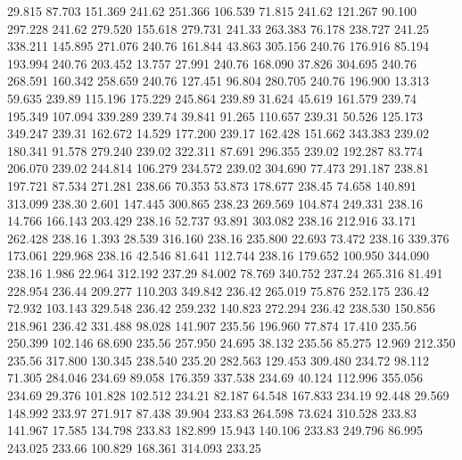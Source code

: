   29.815   87.703  151.369       241.62
 251.366  106.539   71.815       241.62
 121.267   90.100  297.228       241.62
 279.520  155.618  279.731       241.33
 263.383   76.178  238.727       241.25
 338.211  145.895  271.076       240.76
 161.844   43.863  305.156       240.76
 176.916   85.194  193.994       240.76
 203.452   13.757   27.991       240.76
 168.090   37.826  304.695       240.76
 268.591  160.342  258.659       240.76
 127.451   96.804  280.705       240.76
 196.900   13.313   59.635       239.89
 115.196  175.229  245.864       239.89
  31.624   45.619  161.579       239.74
 195.349  107.094  339.289       239.74
  39.841   91.265  110.657       239.31
  50.526  125.173  349.247       239.31
 162.672   14.529  177.200       239.17
 162.428  151.662  343.383       239.02
 180.341   91.578  279.240       239.02
 322.311   87.691  296.355       239.02
 192.287   83.774  206.070       239.02
 244.814  106.279  234.572       239.02
 304.690   77.473  291.187       238.81
 197.721   87.534  271.281       238.66
  70.353   53.873  178.677       238.45
  74.658  140.891  313.099       238.30
   2.601  147.445  300.865       238.23
 269.569  104.874  249.331       238.16
  14.766  166.143  203.429       238.16
  52.737   93.891  303.082       238.16
 212.916   33.171  262.428       238.16
   1.393   28.539  316.160       238.16
 235.800   22.693   73.472       238.16
 339.376  173.061  229.968       238.16
  42.546   81.641  112.744       238.16
 179.652  100.950  344.090       238.16
   1.986   22.964  312.192       237.29
  84.002   78.769  340.752       237.24
 265.316   81.491  228.954       236.44
 209.277  110.203  349.842       236.42
 265.019   75.876  252.175       236.42
  72.932  103.143  329.548       236.42
 259.232  140.823  272.294       236.42
 238.530  150.856  218.961       236.42
 331.488   98.028  141.907       235.56
 196.960   77.874   17.410       235.56
 250.399  102.146   68.690       235.56
 257.950   24.695   38.132       235.56
  85.275   12.969  212.350       235.56
 317.800  130.345  238.540       235.20
 282.563  129.453  309.480       234.72
  98.112   71.305  284.046       234.69
  89.058  176.359  337.538       234.69
  40.124  112.996  355.056       234.69
  29.376  101.828  102.512       234.21
  82.187   64.548  167.833       234.19
  92.448   29.569  148.992       233.97
 271.917   87.438   39.904       233.83
 264.598   73.624  310.528       233.83
 141.967   17.585  134.798       233.83
 182.899   15.943  140.106       233.83
 249.796   86.995  243.025       233.66
 100.829  168.361  314.093       233.25
